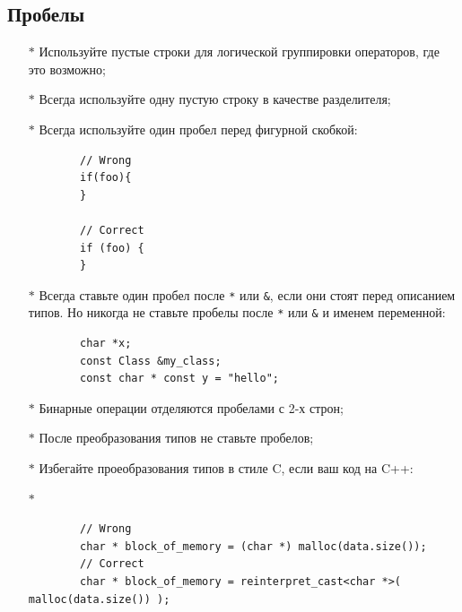 \documentclass[12pt, twoside]{report}
\begin{document}
\subsection*{Пробелы}\label{lab_work_formatting_whitespaces}
\begin{itemize}
	\item [$*$] Используйте пустые строки для логической группировки операторов, где это возможно;
	\item [$*$] Всегда используйте одну пустую строку в качестве разделителя;
	\item [$*$] Всегда используйте один пробел перед фигурной скобкой:
	\begin{lstlisting}
		// Wrong
		if(foo){
		}
		
		// Correct
		if (foo) {
		}
	\end{lstlisting}
	
	\item [$*$] Всегда ставьте один пробел после \texttt{*} или \texttt{\&}, если они стоят перед описанием типов. Но никогда не ставьте пробелы после \texttt{*} или \texttt{\&} и именем переменной:
	\begin{lstlisting}
		char *x;
		const Class &my_class;
		const char * const y = "hello";
	\end{lstlisting}
	\item [$*$] Бинарные операции отделяются пробелами с 2-х строн;
	\item [$*$] После преобразования типов не ставьте пробелов;
	\item [$*$] Избегайте проеобразования типов в стиле C, если ваш код на C++:
	\item [$*$] 
	\begin{lstlisting}
		// Wrong
		char * block_of_memory = (char *) malloc(data.size());
		// Correct
		char * block_of_memory = reinterpret_cast<char *>( malloc(data.size()) );
	\end{lstlisting}
\end{itemize}
\end{document}
